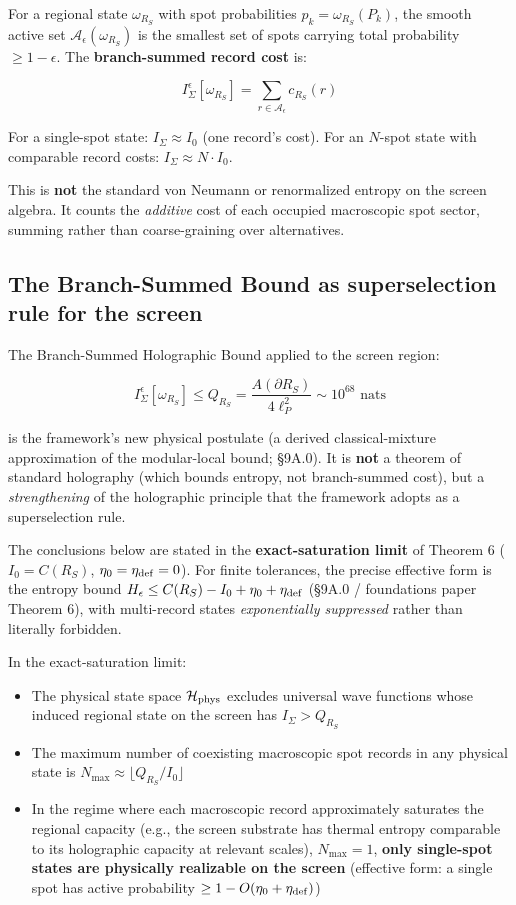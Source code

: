 \documentclass[11pt,a4paper]{article}
\begin{document}
For a regional state $\omega_{R_S}$ with spot probabilities $p_k = \omega_{R_S}(P_k)$, the smooth active set $\mathcal{A}_\epsilon(\omega_{R_S})$ is the smallest set of spots carrying total probability $\ge 1 - \epsilon$. The \textbf{branch-summed record cost} is:

\[
I_\Sigma^\epsilon[\omega_{R_S}] = \sum_{r \in \mathcal{A}_\epsilon} c_{R_S}(r)
\]

For a single-spot state: $I_\Sigma \approx I_0$ (one record's cost).
For an $N$-spot state with comparable record costs: $I_\Sigma \approx N \cdot I_0$.

This is \textbf{not} the standard von Neumann or renormalized entropy on the screen algebra. It counts the \emph{additive} cost of each occupied macroscopic spot sector, summing rather than coarse-graining over alternatives.

\subsection{The Branch-Summed Bound as superselection rule for the screen}

The Branch-Summed Holographic Bound applied to the screen region:

\[
I_\Sigma^\epsilon[\omega_{R_S}] \le Q_{R_S} = \frac{A(\partial R_S)}{4\ell_P^2} \sim 10^{68} \text{ nats}
\]

is the framework's new physical postulate (a derived classical-mixture approximation of the modular-local bound; §9A.0). It is \textbf{not} a theorem of standard holography (which bounds entropy, not branch-summed cost), but a \emph{strengthening} of the holographic principle that the framework adopts as a superselection rule.

The conclusions below are stated in the \textbf{exact-saturation limit} of Theorem 6 ($I_0 = C(R_S)$, $\eta_0 = \eta_{\rm def} = 0$). For finite tolerances, the precise effective form is the entropy bound $H_\epsilon \le C(R_S) - I_0 + \eta_0 + \eta_{\rm def}$ (§9A.0 / foundations paper Theorem 6), with multi-record states \emph{exponentially suppressed} rather than literally forbidden.

In the exact-saturation limit:
\begin{itemize}
  \item The physical state space $\mathcal{H}_{\rm phys}$ excludes universal wave functions whose induced regional state on the screen has $I_\Sigma > Q_{R_S}$
  \item The maximum number of coexisting macroscopic spot records in any physical state is $N_{\max} \approx \lfloor Q_{R_S}/I_0 \rfloor$
  \item In the regime where each macroscopic record approximately saturates the regional capacity (e.g., the screen substrate has thermal entropy comparable to its holographic capacity at relevant scales), $N_{\max} = 1$, \textbf{only single-spot states are physically realizable on the screen} (effective form: a single spot has active probability $\ge 1 - O(\eta_0+\eta_{\rm def})$)
\end{itemize}
\end{document}
